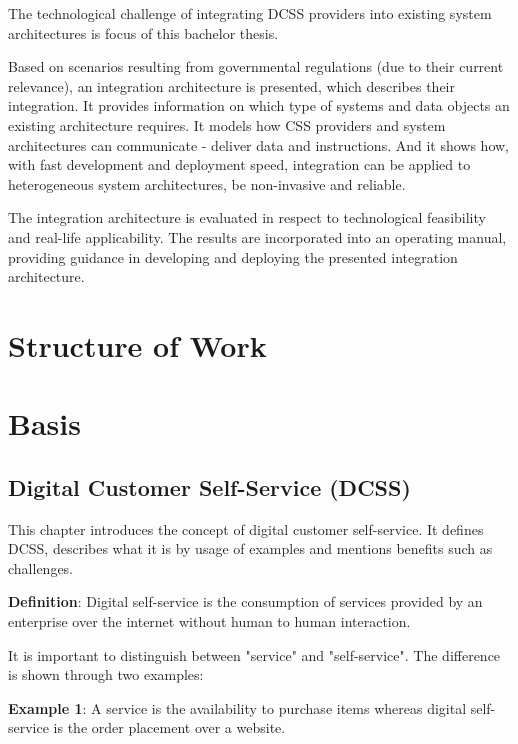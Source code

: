\documentclass[
     12pt,         %
     a4paper,      %
     BCOR10mm,     %
     DIV14,        %
aragraph skip instad of paragraph indent
     ]{scrreprt}
\begin{document}
The technological challenge of integrating DCSS providers into existing system architectures is focus of this bachelor thesis.

Based on scenarios resulting from governmental regulations (due to their current relevance), an integration architecture is presented, which describes
their integration. It provides information on which type of systems and data objects an existing
architecture requires. It models how CSS providers and system architectures can communicate -
deliver data and instructions. And it shows how, with fast development and deployment speed, integration can be applied to
heterogeneous system architectures, be non-invasive and reliable.

The integration architecture is evaluated in respect to technological feasibility and real-life applicability. The results are
incorporated into an operating manual, providing guidance in developing and deploying the presented integration architecture.

\chapter{Structure of Work}



\chapter{Basis}

\section{Digital Customer Self-Service (DCSS)}


This chapter introduces the concept of digital customer self-service. It defines DCSS, describes what it is by usage of examples and mentions benefits such as challenges.

\textbf{Definition}: Digital self-service is the consumption of services provided by an enterprise over the internet without human to human interaction.

It is important to distinguish between "service" and "self-service". The difference is shown through two examples:

\textbf{Example 1}: A service is the availability to purchase items whereas digital self-service is the order placement over a website.
\end{document}
